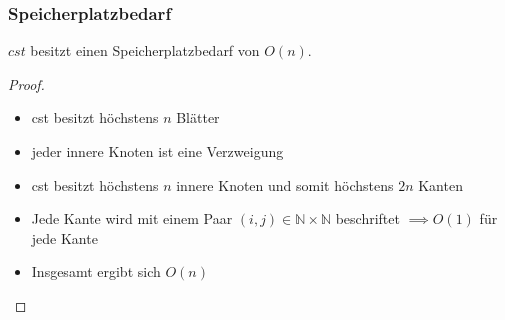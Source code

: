\documentclass{beamer}
\begin{document}
\begin{frame}
\frametitle{Speicherplatzbedarf}
\begin{lemma}
$cst$ besitzt einen Speicherplatzbedarf von $O(n)$.
\end{lemma}
\begin{proof}
\begin{itemize}
    \item cst besitzt höchstens $n$ Blätter
    \item jeder innere Knoten ist eine Verzweigung
    \item cst besitzt höchstens $n$ innere Knoten und somit höchstens $2n$ Kanten
    \item Jede Kante wird mit einem Paar $(i, j) \in \mathbb{N} \times \mathbb{N}$ beschriftet $\implies O(1)$ für jede Kante
    \item Insgesamt ergibt sich $O(n)$
\end{itemize}
\end{proof}
\end{frame}
\end{document}
